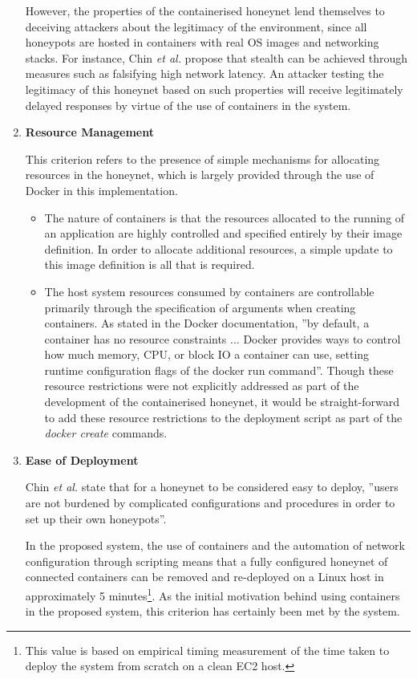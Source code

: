 \begin{enumerate}
However, the properties of the containerised honeynet lend themselves to deceiving attackers about the legitimacy of the environment, since all honeypots are hosted in containers with real OS images and networking stacks. For instance, Chin \textit{et al.} propose that stealth can be achieved through measures such as falsifying high network latency. \cite{5319295} An attacker testing the legitimacy of this honeynet based on such properties will receive legitimately delayed responses by virtue of the use of containers in the system.

\item \textbf{Resource Management} 

This criterion refers to the presence of simple mechanisms for allocating resources in the honeynet, which is largely provided through the use of Docker in this implementation. 
\begin{itemize}
\item The nature of containers is that the resources allocated to the running of an application are highly controlled and specified entirely by their image definition. In order to allocate additional resources, a simple update to this image definition is all that is required.
\item The host system resources consumed by containers are controllable primarily through the specification of arguments when creating containers. As stated in the Docker documentation, ''by default, a container has no resource constraints ... Docker provides ways to control how much memory, CPU, or block IO a container can use, setting runtime configuration flags of the docker run command''. \cite{DockerResourceConstraints} Though these resource restrictions were not explicitly addressed as part of the development of the containerised honeynet, it would be straight-forward to add these resource restrictions to the deployment script as part of  the \textit{docker create} commands.
\end{itemize}


\item \textbf{Ease of Deployment} 

Chin \textit{et al.} state that for a honeynet to be considered easy to deploy, ''users are not burdened by complicated configurations and procedures in order to set up their own honeypots''. 

In the proposed system, the use of containers and the automation of network configuration through scripting means that a fully configured honeynet of connected containers can be removed and re-deployed on a Linux host in approximately 5 minutes\footnote{This value is based on empirical timing measurement of the time taken to deploy the system from scratch on a clean EC2 host.}. As the initial motivation behind using containers in the proposed system, this criterion has certainly been met by the system.


\end{enumerate}

